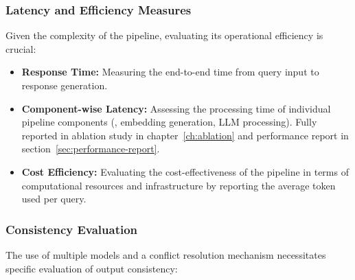 \subsubsection{Latency and Efficiency Measures}
Given the complexity of the pipeline, evaluating its operational efficiency is crucial:
\begin{itemize}
    \item \textbf{Response Time:} Measuring the end-to-end time from query input to response generation.
    \item \textbf{Component-wise Latency:} Assessing the processing time of individual pipeline components (\eg, embedding generation, LLM processing). Fully reported in ablation study in chapter~\ref{ch:ablation} and performance report in section~\ref{sec:performance-report}.
    \item \textbf{Cost Efficiency:} Evaluating the cost-effectiveness of the pipeline in terms of computational resources and infrastructure by reporting the average token used per query.
\end{itemize}
\subsubsection{Consistency Evaluation}
The use of multiple models and a conflict resolution mechanism necessitates specific evaluation of output consistency:

